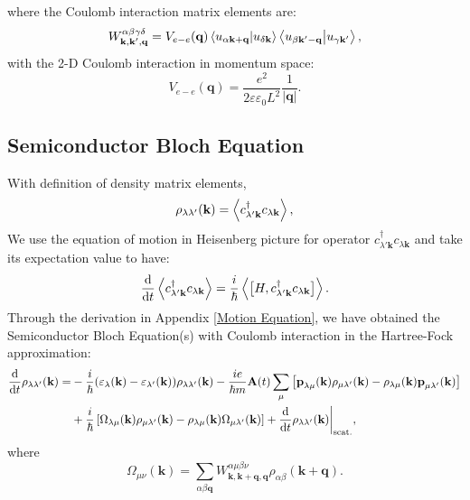 \documentclass[12pt,english,a4paper]{article}
\newcommand{\dg}{\dagger}
\begin{document}
\quad where the Coulomb interaction matrix elements are:
	\begin{equation}
		W^{\alpha \beta \gamma \delta}_{\textbf{k}, \textbf{k}',\textbf{q}} = V_{e-e}(\textbf{q}) \braket{u_{\alpha\textbf{k} +\textbf{q}}}{u_{\delta\textbf{k}}} \braket{u_{\beta\textbf{k}' -\textbf{q}}}{u_{\gamma \textbf{k}'}},
	\end{equation}
\quad with the 2-D Coulomb interaction in momentum space:
	\begin{equation}
		\label{2D coulomb}
		V_{e-e}(\textbf{q}) = \frac{e^2}{2\varepsilon\varepsilon_0 L^2} \frac{1}{|\textbf{q}|}.
	\end{equation}
	\subsection{Semiconductor Bloch Equation}
\quad With definition of density matrix elements,
	\begin{equation}
		\rho_{\lambda \lambda'}(\textbf{k}) = \ev{c^\dg_{\lambda'\textbf{k}} c_{\lambda\textbf{k}}},
	\end{equation}
\quad We use the equation of motion in Heisenberg picture for operator $c^\dg_{\lambda'\textbf{k}} c_{\lambda\textbf{k}}$ and take its expectation value to have:
	\begin{equation}
		\label{Heisenberg eq}
		\dv{}{t}\ev{c^\dg_{\lambda'\textbf{k}} c_{\lambda\textbf{k}}} = \frac{i}{\hbar}\ev{\big[H,c^\dg_{\lambda'\textbf{k}} c_{\lambda\textbf{k}} \big]}.
	\end{equation}
\quad Through the derivation in Appendix \ref{Motion Equation}, we have obtained the Semiconductor Bloch Equation(s) with Coulomb interaction in the Hartree-Fock approximation:
\begin{align}
	\label{SBE HF}
\dv{ }{t}\rho_{\lambda\lambda'}(\textbf{k}) =& - \frac{i}{\hbar} (\varepsilon_\lambda(\textbf{k}) - \varepsilon_{\lambda'} (\textbf{k}))\rho_{\lambda \lambda'}(\textbf{k}) - \frac{ie}{\hbar m} \textbf{A}(t)\sum_{\mu}\left[\textbf{p}_{\lambda\mu}(\textbf{k})\rho_{\mu \lambda'}(\textbf{k}) - \rho_{\lambda\mu}(\textbf{k})\textbf{p}_{\mu \lambda'}(\textbf{k})\right] \nonumber \\
&+ \frac{i}{\hbar}\left[\Omega_{\lambda \mu}(\textbf{k})\rho_{\mu \lambda'}(\textbf{k}) - \rho_{\lambda\mu}(\textbf{k}) \Omega_{\mu \lambda'} (\textbf{k})\right] +\dv{ }{t}\rho_{\lambda\lambda'}(\textbf{k})\bigg|_{\mathrm{scat.}},
\end{align}
\quad where
\begin{equation}
\Omega_{\mu\nu} (\textbf{k})=\sum_{\alpha \beta \textbf{q}} W^{\alpha \mu \beta \nu}_{\textbf{k},\textbf{k}+\textbf{q},\textbf{q}} \rho_{\alpha\beta} (\textbf{k}+\textbf{q}).
\end{equation}
\end{document}
